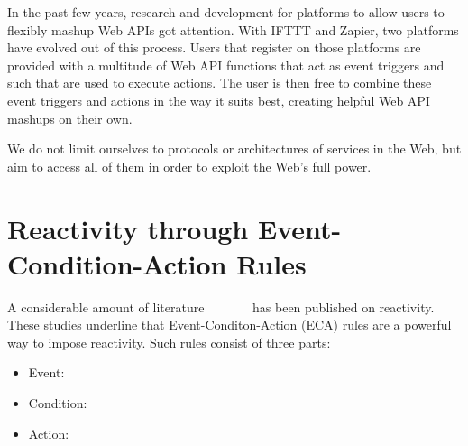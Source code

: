 In the past few years, research and development for platforms to allow users to flexibly mashup Web APIs got attention.
With IFTTT and Zapier, two platforms have evolved out of this process.
Users that register on those platforms are provided with a multitude of Web API functions that act as event triggers and such that are used to execute actions.
The user is then free to combine these event triggers and actions in the way it suits best, creating helpful Web API mashups on their own.


We do not limit ourselves to protocols or architectures of services in the Web, but aim to access all of them in order to exploit the Web's full power.


\section{Reactivity through Event-Condition-Action Rules}
A considerable amount of literature~\cite{alferes2006event}~\cite{2007_AlferesR3}~\cite{2005-Bry_etal-XChange.pdf}~\cite{10.1007-11896548_63}~\cite{Elliott:2009:PFR:1596638.1596643}~\cite{2009-Paschke_Boley-RCER.pdf}~\cite{2012-Paschke_etal-ReactionRuleML.pdf} has been published on reactivity.
These studies underline that Event-Conditon-Action (\textrm{ECA}) rules are a powerful way to impose reactivity.
Such rules consist of three parts:
\begin{itemize}
  \item Event:
  \item Condition:
  \item Action:
\end{itemize}

\cite{robins2010complex}


